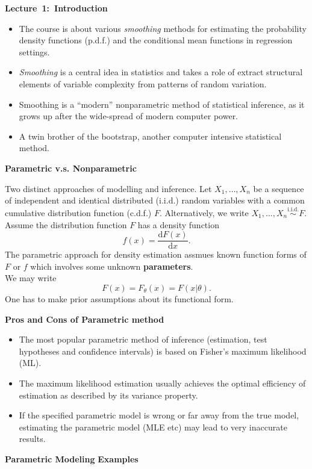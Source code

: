 \documentclass[19pt,landscaoe]{article}
\begin{document}
{\LARGE\centerline{\textbf{Lecture~1:~Introduction}}}
\vskip25pt
\begin{minipage}{.9\textwidth}
    \Large
\begin{itemize}
\item The course is about various {\it smoothing} methods for estimating the probability density functions (p.d.f.) and the conditional mean functions in regression settings.
\item {\it Smoothing} is a central idea in statistics and takes a role of extract structural elements of variable complexity from patterns of random variation. 
\item Smoothing is a ``modern'' nonparametric method of statistical inference, as it grows up after the wide-spread of modern computer power. 
\item A twin brother of the bootstrap, another computer intensive statistical
method.

\end{itemize}
\end{minipage}
\newpage
{\Large\centerline{\textbf{Parametric v.s. Nonparametric}}}
\vskip25pt
\begin{minipage}{.9\textwidth}
    \Large
Two distinct approaches of modelling and inference. 
\vskip 5pt
Let $X_1,\dots,X_n$ be a sequence of independent and identical distributed (i.i.d.) random variables with a common cumulative distribution function (c.d.f.) $F$. Alternatively, we write $X_1,\dots,X_n\overset{\mathrm{i.i.d.}}{\sim}F$. \\Assume the distribution function $F$ has a density function $$f(x)=\frac{\mathrm{d}F(x)}{\mathrm{d}x}.$$  
The parametric approach for density estimation assmues known function forms of $F$ or $f$ which involves some unknown {\bf parameters}.\\ We may write
$$F(x)=F_\theta(x)=F(x|\theta).$$
One has to make prior assumptions about its functional form.
\end{minipage}
\newpage
{\LARGE\centerline{\textbf{Pros and Cons of Parametric method}}}
\vskip25pt
\begin{minipage}{.9\textwidth}
    \Large
\begin{itemize}
\item The most popular parametric method of inference (estimation, test hypotheses and confidence intervals) is based on Fisher's maximum likelihood (ML).
\item The maximum likelihood estimation usually achieves the optimal efficiency of estimation as described by its variance property.
\item If the specified parametric model is wrong or far away from the true model, estimating the parametric model (MLE etc) may lead to very inaccurate results. 

\end{itemize}
\end{minipage}
\newpage
{\LARGE{\textbf{Parametric Modeling}}}
\vskip25pt
{\Large\bf{Examples}}
   
\end{document}
